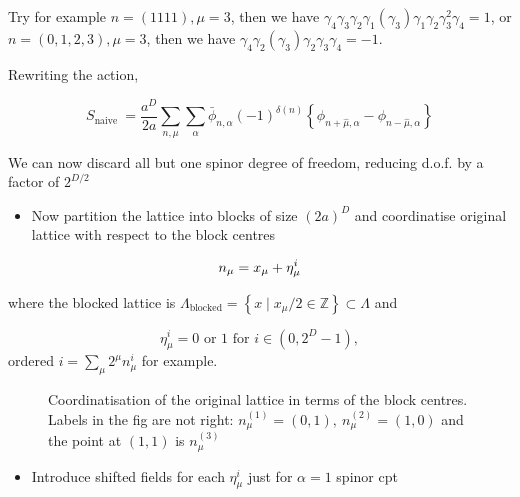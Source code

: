 Try for example $n = (1 1 1 1), \mu = 3$, then we have $\gamma_4 \gamma_3 \gamma_2 \gamma _ 1 (\gamma_3)\gamma_1 \gamma_2 \gamma_3^2 \gamma_4 = 1$, or $n = (0,1,2,3), \mu = 3$, then we have $\gamma_4 \gamma_2 (\gamma_3)\gamma_2 \gamma_3 \gamma_4 = -1$.

Rewriting the action,

\begin{equation}
\label{eq:diag_action}
S_{\text {naive }}=\frac{a^{D}}{2 a} \sum_{n,\mu} \sum_{\alpha} \bar{\phi}_{n, \alpha}(-1)^{\delta(n)}\left\{\phi_{n+\hat{\mu}, \alpha}-\phi_{n-\hat{\mu}, \alpha}\right\}
\end{equation}

We can now discard all but one spinor degree of freedom, reducing d.o.f. by a factor of \(2^{D / 2}\)

\begin{itemize}
  \item Now partition the lattice into blocks of size \((2 a)^{D}\) and coordinatise original lattice with respect to the block centres
\end{itemize}

\begin{equation}
n_{\mu}=x_{\mu}+\eta_{\mu}^{i} \\
\end{equation}

where the blocked lattice is
\(\Lambda_{\text{blocked}}=\left\{x \mid x_{\mu} / 2 \in \mathbb{Z}\right\}\subset \Lambda\)
and

\begin{equation}
\eta_{\mu}^{i}=0 \text { or } 1 \text { for } i \in\left(0,2^{D}-1\right),
\end{equation}
ordered $i = \sum_\mu 2^\mu n_\mu^i$ for example.

\begin{figure}
\caption{Coordinatisation of the original lattice in terms of the block centres. {\color{red} Labels in the fig are not right: $n_\mu^{(1)}=(0,1),\ n_\mu^{(2)}=(1,0)$ and the point at $(1,1)$ is $n_\mu^{(3)}$}}
\end{figure}

\begin{itemize}
  \item Introduce shifted fields for each \(\eta_{\mu}^{i}\) just for \(\alpha=1\) spinor cpt
\end{itemize}


